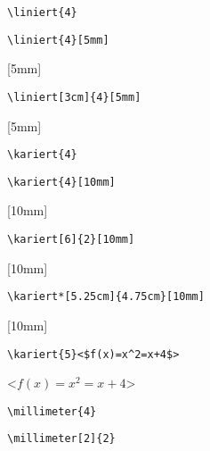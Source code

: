 \documentclass[]{arbeitsblatt}
\begin{document}
\begin{verbatim}
\liniert{4}
\end{verbatim}




\begin{verbatim}
\liniert{4}[5mm]
\end{verbatim}

[5mm]



\begin{verbatim}
\liniert[3cm]{4}[5mm]
\end{verbatim}

[5mm]

\pagebreak

\begin{verbatim}
\kariert{4}
\end{verbatim}




\begin{verbatim}
\kariert{4}[10mm]
\end{verbatim}

[10mm]



\begin{verbatim}
\kariert[6]{2}[10mm]
\end{verbatim}

[10mm]



\begin{verbatim}
\kariert*[5.25cm]{4.75cm}[10mm]
\end{verbatim}

\kariert*[5.25cm]{4.75cm}[10mm]



\begin{verbatim}
\kariert{5}<$f(x)=x^2=x+4$>
\end{verbatim}

<$f(x)=x^2=x+4$>

\pagebreak

\begin{verbatim}
\millimeter{4}
\end{verbatim}




\begin{verbatim}
\millimeter[2]{2}
\end{verbatim}
\end{document}
